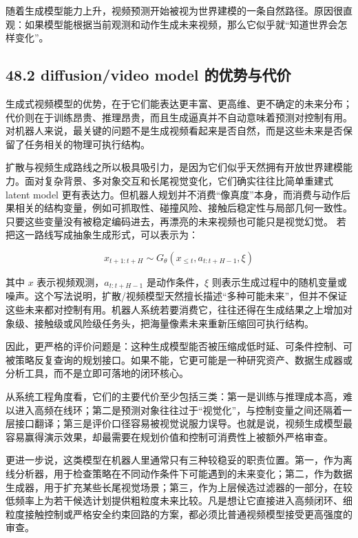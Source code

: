 随着生成模型能力上升，视频预测开始被视为世界建模的一条自然路径。原因很直观：如果模型能根据当前观测和动作生成未来视频，那么它似乎就“知道世界会怎样变化”。

\subsection*{48.2 diffusion/video model 的优势与代价}


生成式视频模型的优势，在于它们能表达更丰富、更高维、更不确定的未来分布；代价则在于训练昂贵、推理昂贵，而且生成逼真并不自动意味着预测对控制有用。对机器人来说，最关键的问题不是生成视频看起来是否自然，而是这些未来是否保留了任务相关的物理可执行结构。

扩散与视频生成路线之所以极具吸引力，是因为它们似乎天然拥有开放世界建模能力。面对复杂背景、多对象交互和长尾视觉变化，它们确实往往比简单重建式 latent model 更有表达力。但机器人规划并不消费“像真度”本身，而消费与动作后果相关的结构变量，例如可抓取性、碰撞风险、接触后稳定性与局部几何一致性。只要这些变量没有被稳定编码进去，再漂亮的未来视频也可能只是视觉幻觉。 若把这一路线写成抽象生成形式，可以表示为：

\begin{equation*}
x_{t+1:t+H} \sim G_\theta(x_{\le t}, a_{t:t+H-1}, \xi)
\end{equation*}

其中 \(x\) 表示视频观测，\(a_{t:t+H-1}\) 是动作条件，\(\xi\) 则表示生成过程中的随机变量或噪声。这个写法说明，扩散/视频模型天然擅长描述“多种可能未来”，但并不保证这些未来都对控制有用。机器人系统若要消费它，往往还得在生成结果之上增加对象级、接触级或风险级任务头，把海量像素未来重新压缩回可执行结构。

因此，更严格的评价问题是：这种生成模型能否被压缩成低时延、可条件控制、可被策略反复查询的规划接口。如果不能，它更可能是一种研究资产、数据生成器或分析工具，而不是立即可落地的闭环核心。

从系统工程角度看，它们的主要代价至少包括三类：第一是训练与推理成本高，难以进入高频在线环；第二是预测对象往往过于“视觉化”，与控制变量之间还隔着一层接口翻译；第三是评价口径容易被视觉说服力误导。也就是说，视频生成模型最容易赢得演示效果，却最需要在规划价值和控制可消费性上被额外严格审查。

更进一步说，这类模型在机器人里通常只有三种较稳妥的职责位置。第一，作为离线分析器，用于检查策略在不同动作条件下可能遇到的未来变化；第二，作为数据生成器，用于扩充某些长尾视觉场景；第三，作为上层候选过滤器的一部分，在较低频率上为若干候选计划提供粗粒度未来比较。凡是想让它直接进入高频闭环、细粒度接触控制或严格安全约束回路的方案，都必须比普通视频模型接受更高强度的审查。

